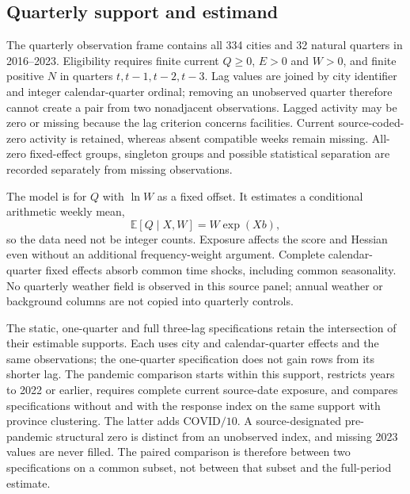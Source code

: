 \subsection{Quarterly support and estimand}
\label{sec:si-quarterly-dynamics}

The quarterly observation frame contains all 334 cities and 32 natural quarters in
2016--2023.  Eligibility requires finite current $Q\geq0$, $E>0$ and
$W>0$, and finite positive $N$ in quarters $t,t-1,t-2,t-3$.  Lag values are
joined by city identifier and integer calendar-quarter ordinal; removing an
unobserved quarter therefore cannot create a pair from two nonadjacent
observations.  Lagged activity may be zero or missing because the lag criterion
concerns facilities.  Current source-coded-zero activity is retained, whereas
absent compatible weeks remain missing.  All-zero fixed-effect groups,
singleton groups and possible statistical separation are recorded separately
from missing observations.

The model is for $Q$ with $\ln W$ as a fixed offset.  It estimates a conditional
arithmetic weekly mean,
\[
 \mathbb E[Q\mid X,W]=W\exp(Xb),
\]
so the data need not be integer counts.  Exposure affects the score and Hessian
even without an additional frequency-weight argument.  Complete calendar-
quarter fixed effects absorb common time shocks, including common seasonality.
No quarterly weather field is observed in this source panel; annual weather or
background columns are not copied into quarterly controls.

The static, one-quarter and full three-lag specifications retain the
intersection of their estimable supports.  Each uses city and calendar-quarter
effects and the same observations; the one-quarter specification does not gain
rows from its shorter lag.  The pandemic comparison starts within this support,
restricts years to 2022 or earlier, requires complete current source-date
 exposure, and compares specifications without and with the response index on
 the same support with province clustering.  The latter adds $\mathrm{COVID}/10$.
A source-designated pre-pandemic structural zero is distinct from an unobserved
index, and missing 2023 values are never filled.  The paired comparison is
therefore between two specifications on a common subset, not between that
subset and the full-period estimate.

